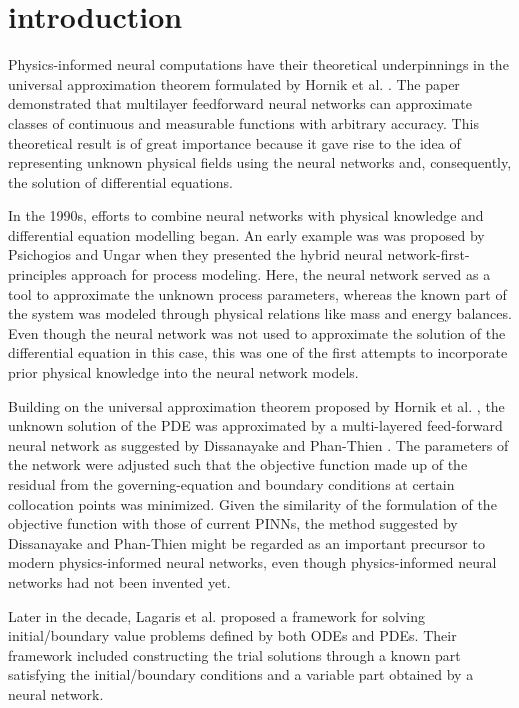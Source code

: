 \documentclass[11pt]{article}
\begin{document}
\tableofcontents
\clearpage




\section{introduction}
Physics-informed neural computations have their theoretical 
underpinnings in the universal approximation theorem formulated 
by Hornik et al. \cite{hornikMultilayerFeedforwardNetworks1989}. 
The paper demonstrated that multilayer feedforward neural networks can 
approximate classes of continuous and measurable functions with
arbitrary accuracy. This theoretical result is of great importance
because it gave rise to the idea of representing unknown physical 
fields using the neural networks and, consequently, the solution of 
differential equations.

In the 1990s, efforts to combine neural networks with physical 
knowledge and differential equation modelling began. An early example was 
was proposed by Psichogios and Ungar \cite{psichogiosHybridNeuralNetworkfirst1992} when they presented 
the hybrid neural network-first-principles approach for process modeling. 
Here, the neural network served as a tool to approximate the unknown 
process parameters, whereas the known part of the system was modeled 
through physical relations like mass and energy balances. Even though 
the neural network was not used to approximate the solution of the
differential equation in this case, this was one of the first 
attempts to incorporate prior physical knowledge into the neural 
network models.

Building on the universal approximation theorem proposed by Hornik et al. \cite{hornikMultilayerFeedforwardNetworks1989},
the unknown solution of the PDE was approximated by a multi-layered feed-forward 
neural network as suggested by Dissanayake and Phan-Thien \cite{dissanayakeNeuralnetworkbasedApproximationsSolving1994}. The parameters 
of the network were adjusted such that the objective function made up of the residual 
from the governing-equation and boundary conditions at certain collocation points was minimized.
Given the similarity of the formulation of the objective function with those of 
current PINNs, the method suggested by Dissanayake and Phan-Thien might be regarded 
as an important precursor to modern physics-informed neural networks, even though physics-informed neural networks 
had not been invented yet.

Later in the decade, Lagaris et al. \cite{lagarisArtificialNeuralNetworks1998} proposed a framework for solving 
initial/boundary value problems defined by both ODEs and PDEs. 
Their framework included constructing the trial solutions through 
a known part satisfying the initial/boundary conditions and a variable part 
obtained by a neural network.
\end{document}
